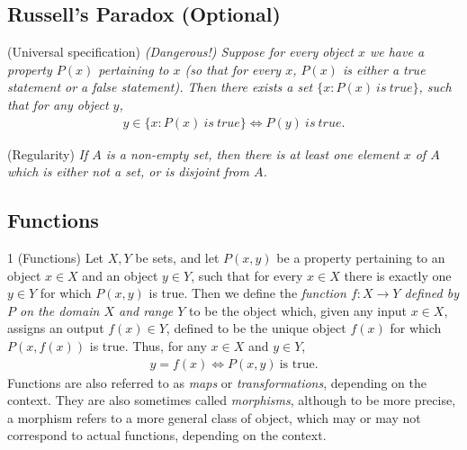 \subsection{Russell's Paradox (Optional)}
\begin{axiom}
    \label{ax-universal-specification}
    (Universal specification) \emph{(Dangerous!) Suppose for every object $x$ we have a property $P(x)$ pertaining
    to $x$ (so that for every $x$, $P(x)$ is either a true statement or a false statement). Then there exists a set
    $\{x:P(x)~is~true\}$, such that for any object $y$,
    \begin{align*}
        y\in \{x:P(x)~is~true\} \iff P(y)~is~true.
    \end{align*}}
\end{axiom}

\begin{axiom}
    \label{ax-regularity}
    (Regularity) \emph{If $A$ is a non-empty set, then there is at least one element $x$ of $A$ which is either not a set,
    or is disjoint from $A$.}
\end{axiom}

\subsection{Functions}
\begin{definition}{1}
    \label{function}
    (Functions) Let $X, Y$ be sets, and let $P(x, y)$ be a property pertaining to an object $x\in X$ and an object
    $y\in Y$, such that for every $x\in X$ there is exactly one $y\in Y$ for which $P(x, y)$ is true.
    Then we define the \emph{function $f: X\rightarrow Y$ defined by $P$ on the domain $X$ and range $Y$} to be the
    object which, given any input $x\in X$, assigns an output $f(x)\in Y$, defined to be the unique object $f(x)$ for
    which $P(x, f(x))$ is true. Thus, for any $x\in X$ and $y\in Y$,
    \begin{align*}
        y=f(x) \iff P(x, y)~\text{is true}.
    \end{align*}
    Functions are also referred to as \emph{maps} or \emph{transformations}, depending on the context. They are also
    sometimes called \emph{morphisms}, although to be more precise, a morphism refers to a more general class of object,
    which may or may not correspond to actual functions, depending on the context.
\end{definition}

